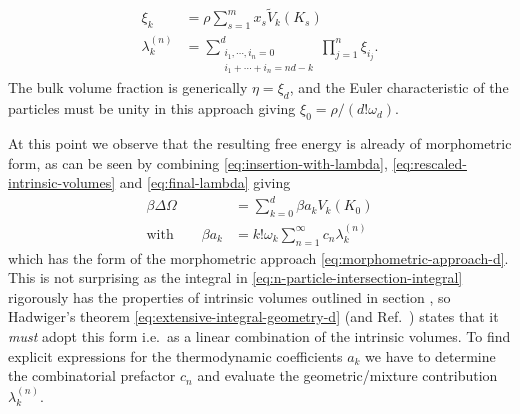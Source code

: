\documentclass[11pt,twoside]{report}
\begin{document}
\begin{subequations}
  \begin{align}
    \label{eq:spt-variables-resummation}
    \xi_k
    &=
    \rho \sum_{s = 1}^m x_s \widetilde{V}_k(K_s)
    \\
    \label{eq:little-lambda}
    \lambda_k^{(n)}
    &=
    \sum_{\substack{i_1, \cdots, i_n = 0 \\ i_1 + \cdots + i_n = nd - k}}^d
    \prod_{j=1}^n
    \xi_{i_j}.
  \end{align}
\end{subequations}
The bulk volume fraction is generically $\eta = \xi_d$, and the Euler characteristic of the particles must be unity in this approach giving $\xi_0 = \rho / (d! \omega_d)$.

At this point we observe that the resulting free energy is already of morphometric form, as can be seen by combining \eqref{eq:insertion-with-lambda}, \eqref{eq:rescaled-intrinsic-volumes} and \eqref{eq:final-lambda} giving
\begin{subequations}\label{eq:morphometric-approach-from-virial}
  \begin{align}
    \beta \Delta \Omega
    &=
    \sum_{k=0}^d \beta a_k V_k(K_0)
    \\ \textrm{with} \qquad
    \beta a_k
    &=
    k! \omega_k \sum_{n=1}^\infty c_n \lambda_k^{(n)}
    \label{eq:a-coefficient}
  \end{align}
\end{subequations}
which has the form of the morphometric approach \eqref{eq:morphometric-approach-d}.
This is not surprising as the integral in \eqref{eq:n-particle-intersection-integral} rigorously has the properties of intrinsic volumes outlined in section \label{sec:morph-overview}, so Hadwiger's theorem \eqref{eq:extensive-integral-geometry-d} (and Ref.\ \cite{Hadwiger1957}) states that it \emph{must} adopt this form i.e.\ as a linear combination of the intrinsic volumes.
To find explicit expressions for the thermodynamic coefficients $a_k$ we have to determine the combinatorial prefactor $c_n$ and evaluate the geometric/mixture contribution $\lambda_k^{(n)}$.
\end{document}
